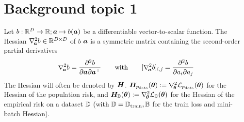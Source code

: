\blindtext

%

\section{Background topic 1}\label{sec:background-1::topic-1}

\begin{definition}\label{def:background::Hessian}
  Let $b: {\mathbb{R}}^D \to {\mathbb{R}}; {\bm{a}} \mapsto b({\bm{a}})$ be a differentiable
  vector-to-scalar function. The Hessian $\nabla_{\!{{\bm{a}}}}^{2} b \in {\mathbb{R}}^{D\times
    D}$ of $b$ \wrt ${\bm{a}}$ is a symmetric matrix containing the second-order
  partial derivatives
  \begin{align}
    \label{eq:background::HessianVectorToScalar}
    \nabla_{\!{{\bm{a}}}}^{2}b = \frac{\partial^2 b}{\partial {\bm{a}} \partial {\bm{a}}^{\top}}
    \qquad
    \text{with}
    \qquad
    [\nabla_{\!{{\bm{a}}}}^{2}b]_{i,j} = \frac{\partial^2 b}{\partial {a}_i \partial {a}_j}
  \end{align}
  The Hessian will often be denoted by ${\bm{H}}$. \Eg ${\bm{H}}_{p_{\mathrm{data}}}({\bm{\theta}}) :=
  \nabla_{\!{{\bm{\theta}}}}^{2} {\mathcal{L}}_{p_{\mathrm{data}}}({\bm{\theta}})$ for the Hessian of the population
  risk, and ${\bm{H}}_{{\mathbb{D}}}({\bm{\theta}}) := \nabla_{\!{{\bm{\theta}}}}^{2} {\mathcal{L}}_{{\mathbb{D}}}({\bm{\theta}})$ for
  the Hessian of the empirical risk on a dataset ${\mathbb{D}}$ (with ${\mathbb{D}} = {\mathbb{D}}_{\mathrm{train}},{\mathbb{B}}$
  for the train loss and mini-batch Hessian).
\end{definition}

